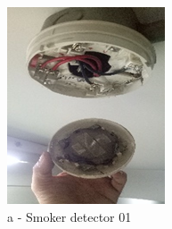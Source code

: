 \begin{figure}[!h]
	
	\begin{minipage}[b]{0.22\linewidth}
		\centering
		\includegraphics[width=\textwidth]{figures/ch05_fdas_sd01}
		\caption*{a - Smoker detector 01}
	\end{minipage}
	\hspace{0.03cm}
	\begin{minipage}[b]{0.22\linewidth}
		\centering

\end{minipage}
\end{figure}
